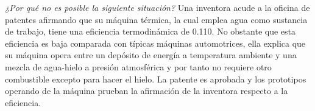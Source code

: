 \item \textit{¿Por qué no es posible la siguiente situación?} Una inventora acude a la oficina de patentes afirmando que su máquina térmica, la cual emplea agua como sustancia de trabajo, tiene una eficiencia termodinámica de 0.110. No obstante que esta eficiencia es baja comparada con típicas máquinas automotrices, ella explica que su máquina opera entre un depósito de energía a temperatura ambiente y una mezcla de agua-hielo a presión atmosférica y por tanto no requiere otro combustible excepto para hacer el hielo. La patente es aprobada y los prototipos operando de la máquina prueban la afirmación de la inventora respecto a la eficiencia.
